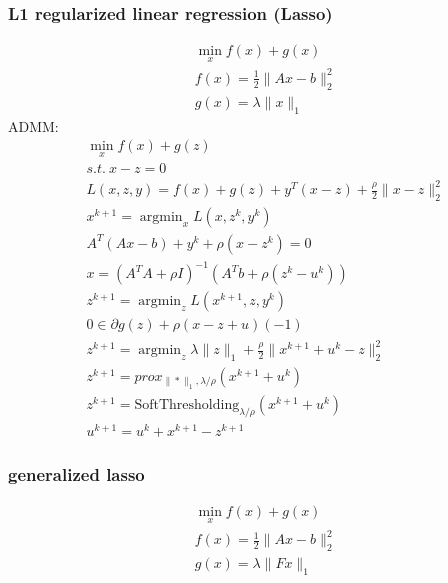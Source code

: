\message{ !name(notebook.tex)}\documentclass[8pt]{report}
\DeclareMathOperator*{\argmin}{argmin}
\newcommand{\norm}[1]{\|#1\|}
\begin{document}
\begin{multicols*}{2}
  \subsubsection{L1 regularized linear regression (Lasso)}
  \begin{align*}
    &\min_x f(x) + g(x)\\
    &f(x) = \frac{1}{2}\norm{Ax-b}_2^2\\
    &g(x)=\lambda\norm{x}_1
  \end{align*}
  ADMM:
  \begin{align*}
    &\min_x f(x) + g(z)\\
    &s.t.\ x-z=0\\
    &L(x,z,y)=f(x) + g(z) + y^T(x-z) + \frac{\rho}{2}\norm{x-z}_2^2\\
    &x^{k+1} = \argmin_x L(x,z^k,y^k)\\
    &A^T(Ax-b) + y^k + \rho (x-z^k)=0\\
    &x = (A^TA+\rho I)^{-1}(A^Tb + \rho (z^k-u^k))\\
    &z^{k+1} = \argmin_z L(x^{k+1},z,y^k)\\
    &0 \in \partial g(z) +\rho(x-z+u)(-1)\\
    &z^{k+1} = \argmin_z \lambda\norm{z}_1 + \frac{\rho}{2}\norm{x^{k+1}+u^k-z}_2^2\\
    &z^{k+1} = prox_{\norm{*}_1, \lambda/\rho}(x^{k+1}+u^k)\\
    &z^{k+1} = \text{SoftThresholding}_{\lambda/\rho}(x^{k+1}+u^k)\\
    &u^{k+1} = u^k+x^{k+1}-z^{k+1}
  \end{align*}  

  \vfill\null
  \columnbreak
  
  \subsubsection{generalized lasso}
  \begin{align*}
    &\min_x f(x) + g(x)\\
    &f(x) = \frac{1}{2}\norm{Ax-b}_2^2\\
    &g(x)=\lambda\norm{Fx}_1
  \end{align*}
  

\end{multicols*}
\end{document}

